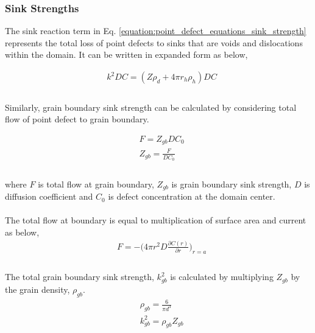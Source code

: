 \documentclass[a4paper]{article}
\begin{document}
    \newpage
    \subsubsection{Sink Strengths} \hspace{10pt}
    The sink reaction term in Eq. \ref{equation:point_defect_equations_sink_strength} represents the total loss of point defects to sinks that are voids and dislocations within the domain. It can be written in expanded form as below,

    \begin{equation}
      \begin{aligned}
        &k^2DC=(Z\rho_d+4\pi r_h\rho_h)DC\\
      \end{aligned}
    \end{equation}\\
    Similarly, grain boundary sink strength can be calculated by considering total flow of point defect to grain boundary.

    \begin{equation}
      \begin{aligned}
        &F=Z_{gb}DC_0\\
        &Z_{gb}=\frac{F}{DC_0}\\
      \end{aligned}
      \end{equation}\\

    where ${F}$ is total flow at grain boundary, ${Z_{gb}}$ is grain boundary sink strength, ${D}$ is diffusion coefficient and ${C_0}$ is defect concentration at the domain center.\\\\
    The total flow at boundary is equal to multiplication of surface area and current as below,\\

    \begin{equation}
      \begin{aligned}
        &F=-\bigg(4\pi r^2D\frac{\partial C(r)}{\partial r}\bigg)_{r=a}\\
      \end{aligned}
    \end{equation}\\
    The total grain boundary sink strength, ${k^2_{gb}}$ is calculated by multiplying ${Z_{gb}}$ by the grain density, ${\rho_{gb}}$.\cite{heald1977}
    \begin{equation}
      \begin{aligned}
        &\rho_{gb}=\frac{6}{\pi d^3}\\
        &k^2_{gb}=\rho_{gb}Z_{gb}\\
      \end{aligned}
    \end{equation}
\end{document}
